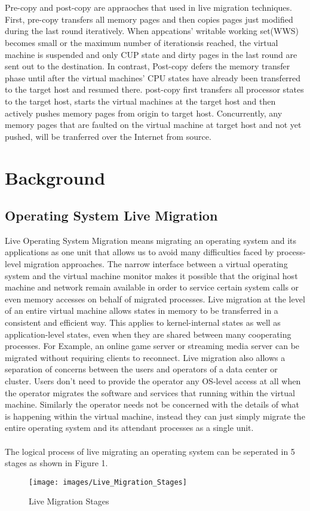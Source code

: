 \documentclass[runningheads]{llncs}
\begin{document}
\\\\
Pre-copy and post-copy are appraoches that used in live migration techniques. First, pre-copy 
transfers all memory pages and then copies pages just modified during the last round iteratively. 
When appcations' writable working set(WWS) becomes small or the maximum number of iterationsis reached, the virtual machine is suspended and only CUP state and dirty pages in the last round are sent out to the destination\cite{clark2005live}. In contrast, Post-copy defers the memory transfer phase until after the virtual machines' CPU states have already been transferred to the target host and resumed there. post-copy first transfers all processor states to the target host, starts the virtual machines at the target host and then actively pushes memory pages from origin to target host. Concurrently, any memory pages that are faulted on the virtual machine at target host and not yet pushed, will be tranferred over the Internet from source.

\section{Background}

\subsection{Operating System Live Migration}
Live Operating System Migration means migrating an operating system and its applications as one unit that allows us to avoid many difficulties faced by process-level migration approaches. The narrow interface between a virtual operating system and the virtual machine monitor makes it possible that the original host machine and network remain available in order to service certain system calls or even memory accesses on behalf of migrated processes\cite{clark2005live}. Live migration at the level of an entire virtual machine allows states in memory to be transferred in a consistent and efficient way. This applies to kernel-internal states as well as application-level states, even when they are shared between many cooperating processes. For Example, an online game server or streaming media server can be migrated without requiring clients to reconnect\cite{clark2005live}. Live migration also allows a separation of concerns between the users and operators of a data center or cluster. Users don't need to provide the operator any OS-level access at all when the operator migrates the software and services that running within the virtual machine. Similarly the operator needs not be concerned with the details of what is happening within the virtual machine, instead they can just simply migrate the entire operating system and its attendant processes as a single unit\cite{clark2005live}.
\\\\
The logical process of live migrating an operating system can be seperated in 5 stages as shown in Figure 1.
\begin{figure}
\centering
\texttt{[image: images/Live\_Migration\_Stages]}
\caption{Live Migration Stages}
\end{figure}
\end{document}
